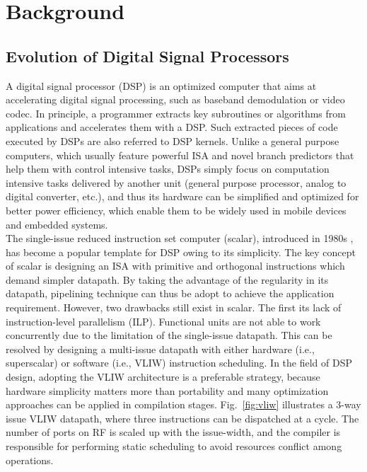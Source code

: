\chapter{Background}
    \section{Evolution of Digital Signal Processors}
        A digital signal processor (DSP) is an optimized computer that aims at accelerating digital signal processing, such as baseband demodulation or video codec.
        In principle, a programmer extracts key subroutines or algorithms from applications and accelerates them with a DSP.
        Such extracted pieces of code executed by DSPs are also referred to DSP kernels.
        Unlike a general purpose computers, which usually feature powerful ISA and novel branch predictors that help them with control intensive tasks,
        DSPs simply focus on computation intensive tasks delivered by another unit (general purpose processor, analog to digital converter, etc.), 
        and thus its hardware can be simplified and optimized for better power efficiency, which enable them to be widely used in mobile devices and embedded systems.
        \\\indent
        The single-issue reduced instruction set computer (scalar), introduced in 1980s \cite{risc}, has become a popular template for DSP owing to its simplicity.
        The key concept of scalar is designing an ISA with primitive and orthogonal instructions which demand simpler datapath.
        By taking the advantage of the regularity in its datapath, pipelining technique can thus be adopt to achieve the application requirement.
        However, two drawbacks still exist in scalar. 
        The first its lack of instruction-level parallelism (ILP). 
        Functional units are not able to work concurrently due to the limitation of the single-issue datapath.
        This can be resolved by designing a multi-issue datapath with either hardware (i.e., superscalar) or software (i.e., VLIW) instruction scheduling.
        In the field of DSP design, adopting the VLIW architecture is a preferable strategy, 
        because hardware simplicity matters more than portability and many optimization approaches can be applied in compilation stages. 
        Fig.~\ref{fig:vliw} illustrates a 3-way issue VLIW datapath, where three instructions can be dispatched at a cycle.
        The number of ports on RF is scaled up with the issue-width, and the compiler is responsible for performing static scheduling to avoid resources conflict among operations.
